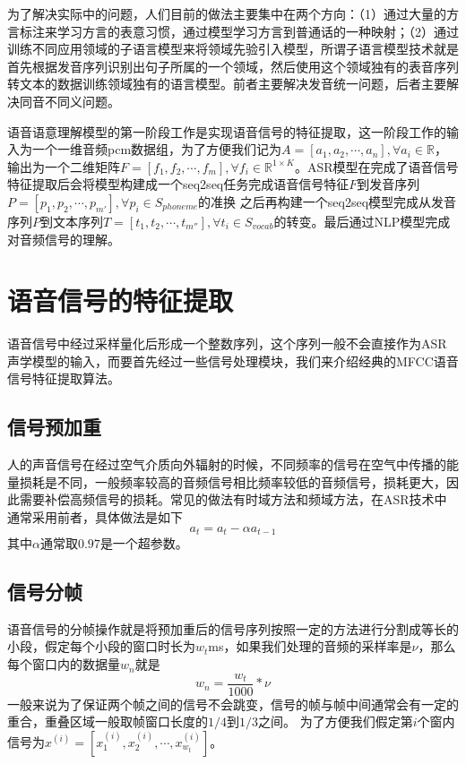 \documentclass[twoside,a4paper,12pt]{book}%
\begin{document}
为了解决实际中的问题，人们目前的做法主要集中在两个方向：（1）通过大量的方言标注来学习方言的表意习惯，通过模型学习方言到普通话的一种映射；（2）通过训练不同应用领域的子语言模型来将领域先验引入模型，所谓子语言模型技术就是首先根据发音序列识别出句子所属的一个领域，然后使用这个领域独有的表音序列转文本的数据训练领域独有的语言模型。前者主要解决发音统一问题，后者主要解决同音不同义问题。

语音语意理解模型的第一阶段工作是实现语音信号的特征提取，这一阶段工作的输入为一个一维音频pcm数据组，为了方便我们记为$A=[a_1,a_2,\cdots,a_n], \forall a_i \in \mathbb{R}$，输出为一个二维矩阵$F=[f_1,f_2,\cdots,f_m], \forall f_i \in \mathbb{R}^{1 \times K}$。ASR模型在完成了语音信号特征提取后会将模型构建成一个seq2seq任务完成语音信号特征$F$到发音序列$P=[p_1,p_2,\cdots,p_{m'}], \forall p_i \in S_{phoneme} $的准换
之后再构建一个seq2seq模型完成从发音序列$P$到文本序列$T=[t_1,t_2,\cdots,t_{m''}], \forall t_i \in S_{vocab}$的转变。最后通过NLP模型完成对音频信号的理解。

\section{语音信号的特征提取}
语音信号中经过采样量化后形成一个整数序列，这个序列一般不会直接作为ASR声学模型的输入，而要首先经过一些信号处理模块，我们来介绍经典的MFCC语音信号特征提取算法。
\subsection{信号预加重}
人的声音信号在经过空气介质向外辐射的时候，不同频率的信号在空气中传播的能量损耗是不同，一般频率较高的音频信号相比频率较低的音频信号，损耗更大，因此需要补偿高频信号的损耗。常见的做法有时域方法和频域方法，在ASR技术中通常采用前者，具体做法是如下
$$
a_t=a_t−\alpha a_{t−1}
$$
其中$\alpha$通常取$0.97$是一个超参数。
\subsection{信号分帧}
语音信号的分帧操作就是将预加重后的信号序列按照一定的方法进行分割成等长的小段，假定每个小段的窗口时长为$w_t$ms，如果我们处理的音频的采样率是$\nu$，那么每个窗口内的数据量$w_n$就是
$$
w_n = \frac{w_t}{1000}*\nu
$$
一般来说为了保证两个帧之间的信号不会跳变，信号的帧与帧中间通常会有一定的重合，重叠区域一般取帧窗口长度的$1/4$到$1/3$之间。
为了方便我们假定第$i$个窗内信号为$x^{(i)}=[x^{(i)}_1,x^{(i)}_2,\cdots,x^{(i)}_{w_t}]$。
\end{document}
